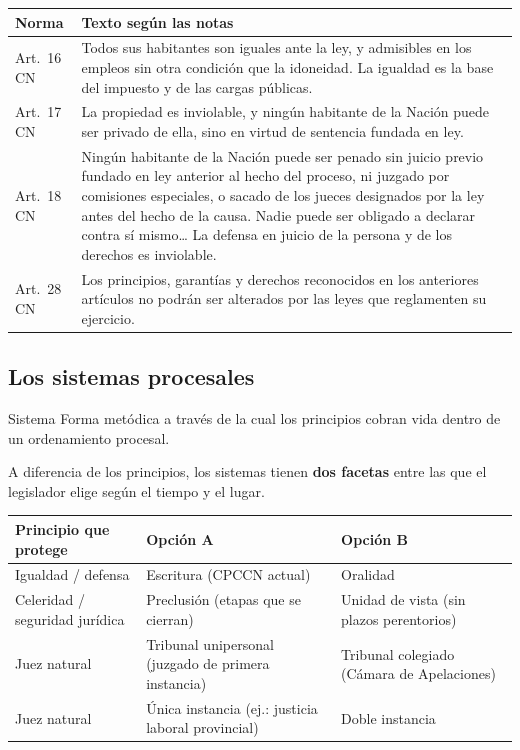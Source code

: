 \documentclass[12pt,oneside]{book}
\renewcommand{\arraystretch}{1.15}
\begin{document}
\begin{table}[H]
\centering
\renewcommand{\arraystretch}{1.2}
\begin{tabularx}{\textwidth}{>{\RaggedRight\arraybackslash}p{3.2cm}>{\RaggedRight\arraybackslash}X}
\toprule
\textbf{Norma} & \textbf{Texto según las notas} \\
\midrule
Art.~16 CN & Todos sus habitantes son iguales ante la ley, y admisibles en los empleos sin otra condición que la idoneidad. La igualdad es la base del impuesto y de las cargas públicas. \\
\addlinespace
Art.~17 CN & La propiedad es inviolable, y ningún habitante de la Nación puede ser privado de ella, sino en virtud de sentencia fundada en ley. \\
\addlinespace
Art.~18 CN & Ningún habitante de la Nación puede ser penado sin juicio previo fundado en ley anterior al hecho del proceso, ni juzgado por comisiones especiales, o sacado de los jueces designados por la ley antes del hecho de la causa. Nadie puede ser obligado a declarar contra sí mismo\ldots{} La defensa en juicio de la persona y de los derechos es inviolable. \\
\addlinespace
Art.~28 CN & Los principios, garantías y derechos reconocidos en los anteriores artículos no podrán ser alterados por las leyes que reglamenten su ejercicio. \\
\bottomrule
\end{tabularx}
\end{table}

\subsection{Los sistemas procesales}

\begin{definition}{Sistema}
Forma metódica a través de la cual los principios cobran vida dentro de un ordenamiento procesal.
\end{definition}

A diferencia de los principios, los sistemas tienen \textbf{dos facetas} entre las que el legislador elige según el tiempo y el lugar.

\begin{table}[H]
\centering
\renewcommand{\arraystretch}{1.2}
\small
\begin{tabularx}{\textwidth}{>{\RaggedRight\arraybackslash}p{3cm}>{\RaggedRight\arraybackslash}X>{\RaggedRight\arraybackslash}X}
\toprule
\textbf{Principio que protege} & \textbf{Opción A} & \textbf{Opción B} \\
\midrule
Igualdad / defensa & Escritura (CPCCN actual) & Oralidad \\
Celeridad / seguridad jurídica & Preclusión (etapas que se cierran) & Unidad de vista (sin plazos perentorios) \\
Juez natural & Tribunal unipersonal (juzgado de primera instancia) & Tribunal colegiado (Cámara de Apelaciones) \\
Juez natural & Única instancia (ej.: justicia laboral provincial) & Doble instancia \\
\bottomrule
\end{tabularx}
\end{table}
\end{document}
